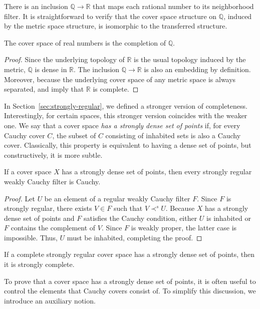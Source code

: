 \documentclass[reqno]{amsart}
\theoremstyle{definition}
\theoremstyle{remark}
\numberwithin{figure}{section}
\newcommand{\rb}{\prec}
\begin{document}
There is an inclusion $\mathbb{Q} \to \mathbb{R}$ that maps each rational number to its neighborhood filter.
It is straightforward to verify that the cover space structure on $\mathbb{Q}$, induced by the metric space structure, is isomorphic to the transferred structure.

\begin{prop}
The cover space of real numbers is the completion of $\mathbb{Q}$.
\end{prop}
\begin{proof}
Since the underlying topology of $\mathbb{R}$ is the usual topology induced by the metric, $\mathbb{Q}$ is dense in $\mathbb{R}$.
The inclusion $\mathbb{Q} \to \mathbb{R}$ is also an embedding by definition.
Moreover, because the underlying cover space of any metric space is always separated,  and  imply that $\mathbb{R}$ is complete.
\end{proof}

In Section~\ref{sec:strongly-regular}, we defined a stronger version of completeness.
Interestingly, for certain spaces, this stronger version coincides with the weaker one.
We say that a cover space \emph{has a strongly dense set of points} if, for every Cauchy cover $C$, the subset of $C$ consisting of inhabited sets is also a Cauchy cover.
Classically, this property is equivalent to having a dense set of points, but constructively, it is more subtle.

\begin{prop}
If a cover space $X$ has a strongly dense set of points, then every strongly regular weakly Cauchy filter is Cauchy.
\end{prop}
\begin{proof}
Let $U$ be an element of a regular weakly Cauchy filter $F$.
Since $F$ is strongly regular, there exists $V \in F$ such that $V \rb^s U$.
Because $X$ has a strongly dense set of points and $F$ satisfies the Cauchy condition, either $U$ is inhabited or $F$ contains the complement of $V$.
Since $F$ is weakly proper, the latter case is impossible.
Thus, $U$ must be inhabited, completing the proof.
\end{proof}

\begin{cor}
If a complete strongly regular cover space has a strongly dense set of points, then it is strongly complete.
\end{cor}

To prove that a cover space has a strongly dense set of points, it is often useful to control the elements that Cauchy covers consist of.
To simplify this discussion, we introduce an auxiliary notion.
\end{document}
